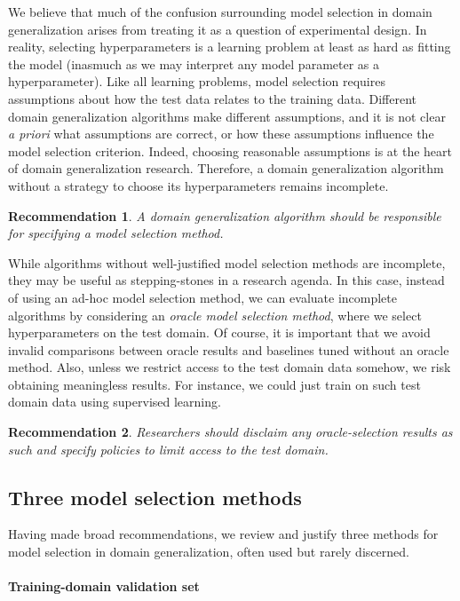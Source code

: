 \documentclass{article}
\newtheorem{recommendation}{Recommendation}
\begin{document}
We believe that much of the confusion surrounding model selection in domain generalization arises from treating it as a question of experimental design.
In reality, selecting hyperparameters is a learning problem at least as hard as fitting the model (inasmuch as we may interpret any model parameter as a hyperparameter).
Like all learning problems, model selection requires assumptions about how the test data relates to the training data.
Different domain generalization algorithms make different assumptions, and it is not clear \textit{a priori} what assumptions are correct, or how these assumptions influence the model selection criterion. 
Indeed, choosing reasonable assumptions is at the heart of domain generalization research.
Therefore, a domain generalization algorithm without a strategy to choose its hyperparameters remains incomplete.

\begin{recommendation}
A domain generalization algorithm should be responsible for specifying a model selection method.
\end{recommendation}

While algorithms without well-justified model selection methods are incomplete, they may be useful as stepping-stones in a research agenda.
In this case, instead of using an ad-hoc model selection method, we can evaluate incomplete algorithms by considering an \emph{oracle model selection method}, where we select hyperparameters on the test domain.
Of course, it is important that we avoid invalid comparisons between oracle results and baselines tuned without an oracle method.
Also, unless we restrict access to the test domain data somehow, we risk obtaining meaningless results.
For instance, we could just train on such test domain data using supervised learning.

\begin{recommendation}
Researchers should disclaim any oracle-selection results as such and specify policies to limit access to the test domain.
\end{recommendation}

\subsection{Three model selection methods}

Having made broad recommendations, we review and justify three methods for model selection in domain generalization, often used but rarely discerned.

\paragraph{Training-domain validation set}
\end{document}
